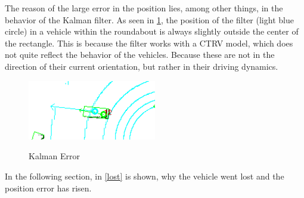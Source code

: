\documentclass[11pt,oneside,openright]{mpreport}
\begin{document}

The reason of the large error in the position lies, among other things, in the behavior of the Kalman filter.
As seen in \cref{kalman_error}, the position of the filter (light blue circle) in a vehicle within the roundabout is always slightly outside the center of the rectangle. 
This is because the filter works with a \ac{CTRV} model, which does not quite reflect the behavior of the vehicles.
Because these are not in the direction of their current orientation, but rather in their driving dynamics.

\begin{figure}[!htb]
  \caption{Kalman Error} 
  \centering
  \includegraphics[width=0.5\textwidth]{bilder/kalman.png}
 \label{kalman_error}
\end{figure}

In the following section, in \cref{lost} is shown, why the vehicle went lost and the position error has risen.
\end{document}
